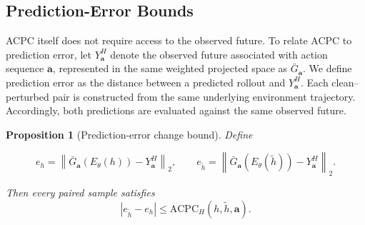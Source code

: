 \documentclass{article}
\newtheorem{proposition}{Proposition}
\begin{document}


\subsection{Prediction-Error Bounds}

ACPC itself does not require access to the observed future. To relate ACPC to
prediction error, let $Y_{\mathbf a}^H$ denote the observed future associated
with action sequence $\mathbf a$, represented in the same weighted projected
space as $\bar G_{\mathbf a}$. We define prediction error as the distance between a
predicted rollout and $Y_{\mathbf a}^H$. Each clean--perturbed pair is
constructed from the same underlying environment trajectory. Accordingly, both
predictions are evaluated against the same observed future.

\begin{proposition}[Prediction-error change bound]
\label{prop:target-free-error-drift}
Define

$$
e_h =
\left\|\bar G_{\mathbf a}(E_\theta(h))-Y_{\mathbf a}^H\right\|_2,
\qquad
e_{\tilde h} =
\left\|\bar G_{\mathbf a}(E_\theta(\tilde h))-Y_{\mathbf a}^H\right\|_2.
$$

Then every paired sample satisfies
\begin{equation}
|e_{\tilde h}-e_h|
\le
\mathrm{ACPC}_H(h,\tilde h,\mathbf a).
\label{eq:target-free-error-drift}
\end{equation}
\end{proposition}
\end{document}
